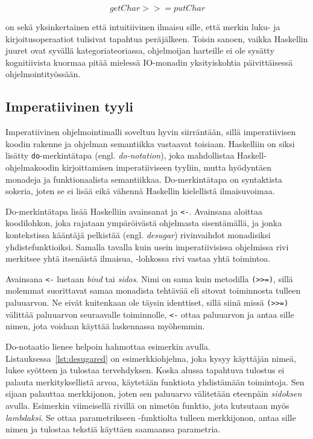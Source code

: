 \documentclass[finnish]{tktltiki2}
\begin{document}
$$ getChar >>= putChar $$

on sekä yksinkertainen että intuitiivinen ilmaisu sille, että merkin luku- ja kirjoitusoperaatiot
tulisivat tapahtua peräjälkeen. Toisin sanoen, vaikka Haskellin juuret ovat syvällä
kategoriateoriassa, ohjelmoijan harteille ei ole sysätty kognitiivista kuormaa pitää mielessä
IO-monadin yksityiskohtia päivittäisessä ohjelmointityössään.

\subsection{Imperatiivinen tyyli}

Imperatiivinen ohjelmointimalli soveltuu hyvin siirräntään, sillä imperatiivisen koodin rakenne ja
ohjelman semantiikka vastaavat toisiaan. Haskelliin on siksi lisätty \verb|do|-merkintätapa (engl.
\emph{do-notation}), joka mahdollistaa Haskell-ohjelmakoodin kirjoittamisen imperatiiviseen tyyliin,
mutta hyödyntäen monadeja ja funktionaalista semantiikkaa. Do-merkintätapa on syntaktista sokeria,
joten se ei lisää eikä vähennä Haskellin kielellistä ilmaisuvoimaa.

Do-merkintätapa lisää Haskelliin avainsanat  ja \verb|<-|. Avainsana  aloittaa
koodilohkon, joka rajataan ympäröivästä ohjelmasta sisentämällä, ja jonka kontekstissa kääntäjä
pelkistää (engl. \emph{desugar}) rivinvaihdot monadisiksi yhdistefunktioiksi. Samalla tavalla kuin
usein imperatiivisissa ohjelmissa rivi merkitsee yhtä itsenäistä ilmaisua, -lohkossa rivi
vastaa yhtä toimintoa.

Avainsana \verb|<-| luetaan \emph{bind} tai \emph{sidos}. Nimi on sama kuin metodilla \verb|(>>=)|,
sillä molemmat suorittavat samaa monadista tehtävää eli sitovat toiminnosta tulleen paluuarvon. Ne
eivät kuitenkaan ole täysin identtiset, sillä siinä missä \verb|(>>=)| välittää paluuarvon
seuraavalle toiminnolle, \verb|<-| ottaa paluuarvon ja antaa sille nimen, jota voidaan käyttää
laskennassa myöhemmin.

Do-notaatio lienee helpoin hahmottaa esimerkin avulla. Listauksessa~\ref{lst:desugared} on
esimerkkiohjelma, joka kysyy käyttäjän nimeä, lukee syötteen ja tulostaa tervehdyksen. Koska alussa
tapahtuva tulostus ei palauta merkityksellistä arvoa, käytetään funktiota  yhdistämään
toimintoja. Sen sijaan  palauttaa merkkijonon, joten sen paluuarvo välitetään
eteenpäin \emph{sidoksen} avulla. Esimerkin viimeisellä rivillä on nimetön funktio, jota kutsutaan
myös \emph{lambdaksi}. Se ottaa parametrikseen -funktiolta tulleen merkkijonon, antaa
sille nimen  ja tulostaa tekstiä käyttäen saamaansa parametria.
\end{document}
